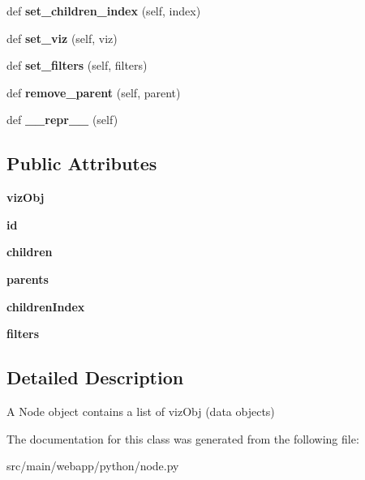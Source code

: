 \begin{DoxyCompactItemize}
def {\bfseries set\+\_\+children\+\_\+index} (self, index)
\item 
\mbox{\label{classpython_1_1node_1_1viz_node_ae22e11fc5f7889225a7181f734944a46}} 
def {\bfseries set\+\_\+viz} (self, viz)
\item 
\mbox{\label{classpython_1_1node_1_1viz_node_a41b710a259b73e5be4d6341f190d81a1}} 
def {\bfseries set\+\_\+filters} (self, filters)
\item 
\mbox{\label{classpython_1_1node_1_1viz_node_a709b0dfbe77255e103e7849ac25783d2}} 
def {\bfseries remove\+\_\+parent} (self, parent)
\item 
\mbox{\label{classpython_1_1node_1_1viz_node_a6286f56b779c28a84f7f0e60f643b4b4}} 
def {\bfseries \+\_\+\+\_\+repr\+\_\+\+\_\+} (self)
\end{DoxyCompactItemize}
\subsection*{Public Attributes}
\begin{DoxyCompactItemize}
\item 
\mbox{\label{classpython_1_1node_1_1viz_node_a8d9c852f81dd5bce235e34a75caea4d6}} 
{\bfseries viz\+Obj}
\item 
\mbox{\label{classpython_1_1node_1_1viz_node_a79b24f162aa1db237d85060cde71da6e}} 
{\bfseries id}
\item 
\mbox{\label{classpython_1_1node_1_1viz_node_abbeb6e09a135acdaf32dc78c39a3f86c}} 
{\bfseries children}
\item 
\mbox{\label{classpython_1_1node_1_1viz_node_aaf714253e88546c43f045b7efb1c5df9}} 
{\bfseries parents}
\item 
\mbox{\label{classpython_1_1node_1_1viz_node_ae552c7fc6ea3c2c9b947d130517cd3f6}} 
{\bfseries children\+Index}
\item 
\mbox{\label{classpython_1_1node_1_1viz_node_afb97a56f5ec5124fa23abf7ffb6b35ed}} 
{\bfseries filters}
\end{DoxyCompactItemize}


\subsection{Detailed Description}
\begin{DoxyVerb}A Node object contains a list of vizObj (data objects)\end{DoxyVerb}
 

The documentation for this class was generated from the following file\+:\begin{DoxyCompactItemize}
\item 
src/main/webapp/python/node.\+py\end{DoxyCompactItemize}
